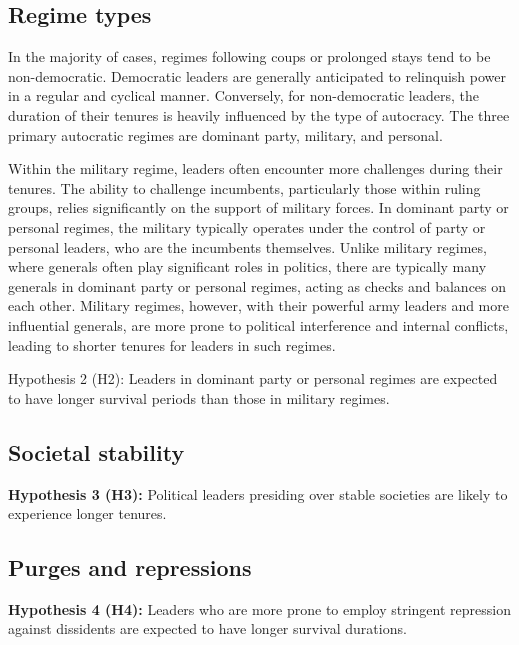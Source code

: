 \documentclass[
  12pt,
  a4paper,
  12pt]{article}
\begin{document}
\hypertarget{regime-types}{%
\subsection{Regime types}\label{regime-types}}

In the majority of cases, regimes following coups or prolonged stays
tend to be non-democratic. Democratic leaders are generally anticipated
to relinquish power in a regular and cyclical manner. Conversely, for
non-democratic leaders, the duration of their tenures is heavily
influenced by the type of autocracy. The three primary autocratic
regimes are dominant party, military, and personal.

Within the military regime, leaders often encounter more challenges
during their tenures. The ability to challenge incumbents, particularly
those within ruling groups, relies significantly on the support of
military forces. In dominant party or personal regimes, the military
typically operates under the control of party or personal leaders, who
are the incumbents themselves. Unlike military regimes, where generals
often play significant roles in politics, there are typically many
generals in dominant party or personal regimes, acting as checks and
balances on each other. Military regimes, however, with their powerful
army leaders and more influential generals, are more prone to political
interference and internal conflicts, leading to shorter tenures for
leaders in such regimes.

Hypothesis 2 (H2): Leaders in dominant party or personal regimes are
expected to have longer survival periods than those in military regimes.

\hypertarget{societal-stability}{%
\subsection{Societal stability}\label{societal-stability}}

\textbf{Hypothesis 3 (H3):} Political leaders presiding over stable
societies are likely to experience longer tenures.

\hypertarget{purges-and-repressions}{%
\subsection{Purges and repressions}\label{purges-and-repressions}}

\textbf{Hypothesis 4 (H4):} Leaders who are more prone to employ
stringent repression against dissidents are expected to have longer
survival durations.
\end{document}
